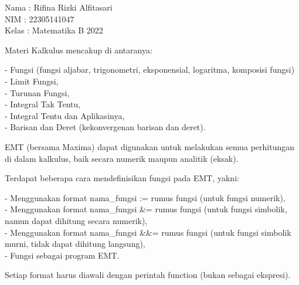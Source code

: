 \documentclass{article}
\begin{document}
\begin{eulernotebook}
\begin{eulercomment}
Nama  : Rifina Rizki Alfitasari\\
NIM   : 22305141047\\
Kelas : Matematika B 2022

\begin{eulercomment}
\begin{eulercomment}
Materi Kalkulus mencakup di antaranya:

- Fungsi (fungsi aljabar, trigonometri, eksponensial, logaritma,
komposisi fungsi)\\
- Limit Fungsi,\\
- Turunan Fungsi,\\
- Integral Tak Tentu,\\
- Integral Tentu dan Aplikasinya,\\
- Barisan dan Deret (kekonvergenan barisan dan deret).

EMT (bersama Maxima) dapat digunakan untuk melakukan semua perhitungan
di dalam kalkulus, baik secara numerik maupun analitik (eksak).

\end{eulercomment}
\begin{eulercomment}
Terdapat beberapa cara mendefinisikan fungsi pada EMT, yakni:

- Menggunakan format nama\_fungsi := rumus fungsi (untuk fungsi
numerik),\\
- Menggunakan format nama\_fungsi \&= rumus fungsi (untuk fungsi
simbolik, namun dapat dihitung secara numerik),\\
- Menggunakan format nama\_fungsi \&\&= rumus fungsi (untuk fungsi
simbolik murni, tidak dapat dihitung langsung),\\
- Fungsi sebagai program EMT.

Setiap format harus diawali dengan perintah function (bukan sebagai
ekspresi).


\end{eulercomment}
\end{eulercomment}
\end{eulercomment}
\end{eulernotebook}
\end{document}
